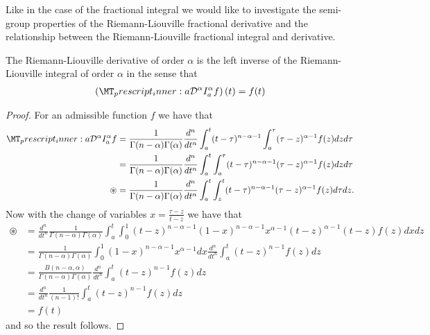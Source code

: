 Like in the case of the fractional integral we would like to investigate the semi-group properties of the Riemann-Liouville fractional derivative and the relationship between the Riemann-Liouville fractional integral and derivative.
\begin{mdframed}[innertopmargin=10pt]
\begin{lemma}
    \label{lem:rld_left_inverse}
    The Riemann-Liouville derivative of order $ \alpha $ is the left inverse of the Riemann-Liouville integral of order $ \alpha $ in the sense
    that
    \begin{align}
        \left(\prescript{}{a}{\mathcal{D}}^\alpha I_a^\alpha f\right)(t) = f(t) 
    \end{align}
\end{lemma}
\end{mdframed}
\begin{proof}
For an admissible function $ f $ we have that
\begin{align}
    \prescript{}{a}{\mathcal{D}}^\alpha I_{a}^\alpha f &= \frac{1}{\Gamma(n-\alpha)\Gamma(\alpha)} \frac{d^n}{dt^n} \int_a^t (t-\tau)^{n-\alpha-1}\int_a^\tau (\tau - z)^{\alpha-1} f(z) dz d\tau \\
    &= \frac{1}{\Gamma(n-\alpha)\Gamma(\alpha)} \frac{d^n}{dt^n} \int_a^t \int_a^\tau (t-\tau)^{n-\alpha-1}(\tau - z)^{\alpha - 1}f(z)dzd\tau \\
    \circledast &= \frac{1}{\Gamma(n-\alpha)\Gamma(\alpha)} \frac{d^n}{dt^n} \int_a^t \int_z^t (t-\tau)^{n-\alpha-1}(\tau - z)^{\alpha - 1} f(z)d\tau dz.
\end{align}
Now with the change of variables $ x = \frac{\tau - z}{t - z} $ we have that
\begin{align}
    \circledast &= \frac{d^n}{dt^n}\frac{1}{\Gamma(n-\alpha)\Gamma(\alpha)}\int_a^t \int_0^1 (t-z)^{n-\alpha-1}(1-x)^{n-\alpha-1} x^{\alpha-1}(t-z)^{\alpha-1}(t-z)f(z)dxdz \\
    &= \frac{1}{\Gamma(n-\alpha)\Gamma(\alpha)} \int_0^1 (1-x)^{n-\alpha-1}x^{\alpha-1} dx \frac{d^n}{dt^n}\int_a^t (t-z)^{n-1}f(z)dz \\
    &= \frac{B(n-\alpha, \alpha)}{\Gamma(n-\alpha)\Gamma(\alpha)} \frac{d^n}{dt^n} \int_a^t (t-z)^{n-1}f(z)dz \\
    &= \frac{d^n}{dt^n} \frac{1}{(n-1)!} \int_{a}^t(t-z)^{n-1}f(z) dz \\
    &= f(t)
\end{align}
and so the result follows.
\end{proof}

